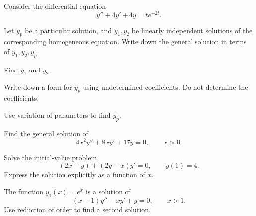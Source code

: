 \documentclass[11pt,oneside]{article}
\begin{document}
\begin{problem}
Consider the differential equation
\[y''+4y'+4y=te^{-2t}.\]
\begin{problemsubparts}
\item Let $y_p$ be a particular solution, and $y_1,y_2$ be linearly independent solutions of the corresponding homogeneous equation. Write down the general solution in terms of $y_1,y_2,y_p$.
\item Find $y_1$ and $y_2$.
\item Write down a form for $y_p$ using undetermined coefficients. Do not determine the coefficients.
\item Use variation of parameters to find $y_p$.
\end{problemsubparts}
\end{problem}

\begin{problem}
Find the general solution of
\[4x^2y''+8xy'+17y=0,\qquad x>0.\]
\end{problem}

\begin{problem}
Solve the initial-value problem
\[(2x-y)+(2y-x)y'=0,\qquad y(1)=4.\]
Express the solution explicitly as a function of $x$.
\end{problem}

\begin{problem}
The function $y_1(x)=e^x$ is a solution of
\[(x-1)y''-xy'+y=0,\qquad x>1.\]
Use reduction of order to find a second solution.
\end{problem}
\end{document}
